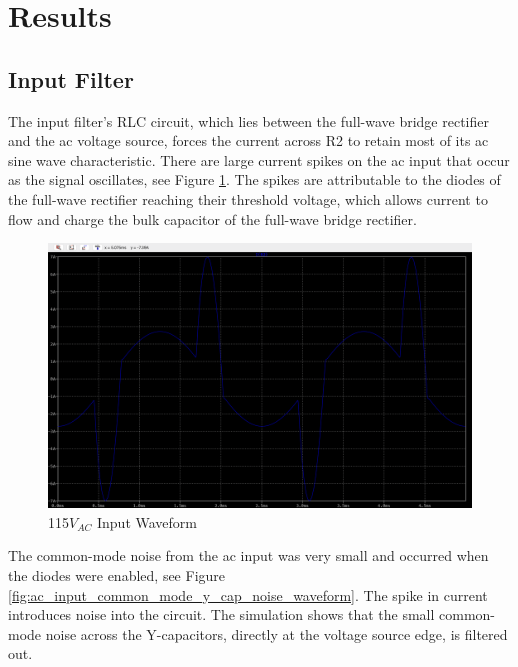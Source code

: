 \documentclass[conference]{IEEEtran}
\begin{document}
\section{Results}
\subsection{Input Filter}

The input filter's RLC circuit, which lies between the full-wave bridge rectifier and the ac voltage source, forces the current across R2 to retain most of its ac sine wave characteristic. There are large current spikes on the ac input that occur as the signal oscillates, see Figure \ref{fig:ac_input_waveform}. The spikes are attributable to the diodes of the full-wave rectifier reaching their threshold voltage, which allows current to flow and charge the bulk capacitor of the full-wave bridge rectifier.

\begin{figure}[htp]
    \centering
    \includegraphics[width=1.0\linewidth]{ac_input_waveform.png}
    \caption{115$V_{AC}$ Input Waveform}
    \label{fig:ac_input_waveform}
\end{figure}

The common-mode noise from the ac input was very small and occurred when the diodes were enabled, see Figure \ref{fig:ac_input_common_mode_y_cap_noise_waveform}. The spike in current introduces noise into the circuit. The simulation shows that the small common-mode noise across the Y-capacitors, directly at the voltage source edge, is filtered out.
\end{document}
